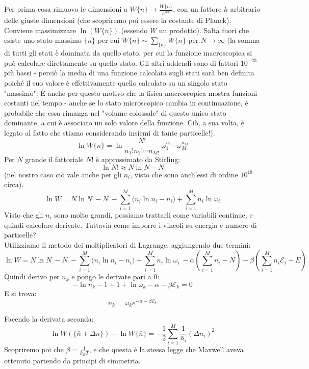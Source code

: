 \documentclass[../MeccanicaStatistica.tex]{subfiles}
\begin{document}
Per prima cosa rimuovo le dimensioni a $W\{n\}\rightarrow\frac{W\{n\}}{h^{3N}}$, con un fattore $h$ arbitrario delle giuste dimensioni (che scopriremo poi essere la costante di Planck).
Conviene massimizzare $\ln{\left(W\{n\}\right)}$ (essendo $W$ un prodotto). Salta fuori che esiste uno stato-massimo $\{\bar{n}\}$ per cui $W\{\bar{n}\}\sim\sum_{\{n\}} W\{n\}$  per $N\rightarrow \infty$ (la somma di tutti gli stati è dominata da quello stato, per cui la funzione macroscopica si può calcolare direttamente su quello stato. Gli altri addendi sono di fattori ${10}^{-23}$ più bassi - perciò la media di una funzione calcolata sugli stati sarà ben definita poiché il suo valore è effettivamente quello calcolato su un singolo stato "massimo". È anche per questo motivo che la fisica macroscopica mostra funzioni costanti nel tempo - anche se lo stato microscopico cambia in continuazione, è probabile che essa rimanga nel "volume colossale" di questo unico stato dominante, a cui è associato un solo valore della funzione. Ciò, a sua volta, è legato al fatto che stiamo considerando insiemi di tante particelle!).
\[
\ln{W\{n\}=\ln{\frac{N!}{n_1!n_2!\cdots n_{M!}}\ \omega_1^{n_1}\cdots\omega_M^{n_M}}}
\]
Per $N$ grande il fattoriale $N!$ è approssimato da Stirling:
\[
\ln{N!\approx N\ln{N}-N}
\]
(nel nostro caso ciò vale anche per gli $n_i$, visto che sono anch'essi di ordine ${10}^{18}$  circa).
\[
\ln{W=N\ln{N\ -N\ -\sum_{i=1}^{M}{(n_i\ln{n_i-n_i)}}}+\sum_{i=1}^{M}{n_i\ln{\omega_i}}}
\]
Visto che gli $n_i$ sono molto grandi, possiamo trattarli come variabili continue, e quindi calcolare derivate. Tuttavia come imporre i vincoli su energia e numero di particelle?\\
Utilizziamo il metodo dei moltiplicatori di Lagrange, aggiungendo due termini: 
\[
\ln{W=N\ln{N\ -N\ -\sum_{i=1}^{M}{(n_i\ln{n_i-n_i)}}}+\sum_{i=1}^{M}{n_i\ln{\omega_i}}\ -\alpha\left(\sum_{i=1}^{M}{n_i-N}\right)-\beta\left(\sum_{i=1}^{M}{n_i\mathcal{E}_i-E}\right)}
\]
Quindi derivo per $n_k$ e pongo le derivate pari a $0$:
\[
-\ln{n_k-1+1+\ln{\omega_k-\alpha-\beta\mathcal{E}_k=0}}
\]
E si trova:
\[
{\bar{n}}_k= \omega_ke^{-\alpha-\beta\mathcal{E}_k}
\]

Facendo la derivata seconda:
\[
\ln{W\left(\{\bar{n}+\Delta n\}\right)-\ln{W\{\bar{n}\}=-\frac{1}{2}}}\sum_{i=1}^{M}{\frac{1}{{\bar{n}}_i}\left(\Delta n_i\right)^2}
\]
Scopriremo poi che $\beta=\frac{1}{k_BT}$, e che questa è la stessa legge che Maxwell aveva ottenuto partendo da principi di simmetria.

\end{document}
